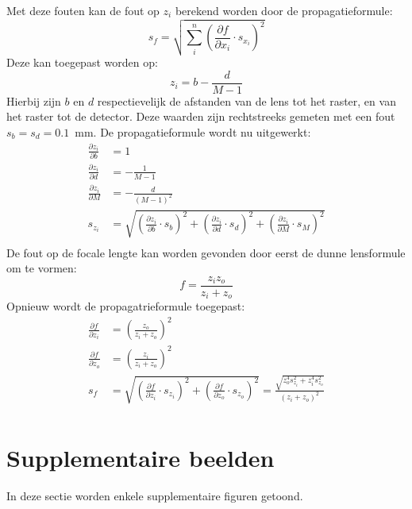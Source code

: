 \documentclass[we,twoside,openright,a4paper,11pt]{uantwerpenbamathesis}
\begin{document}
Met deze fouten kan de fout op $z_i$ berekend worden door de propagatieformule:
\begin{equation*}
    s_f=\sqrt{\sum_i^n \left(\frac{\partial f}{\partial x_i}\cdot s_{x_i}\right)^2}
\end{equation*}
Deze kan toegepast worden op:
\begin{equation*}
    z_i=b-\frac{d}{M-1}
\end{equation*}
Hierbij zijn $b$ en $d$ respectievelijk de afstanden van de lens tot het raster, en van het raster tot de detector. Deze waarden zijn rechtstreeks gemeten met een fout $s_b=s_d=0.1$~mm. De propagatieformule wordt nu uitgewerkt:
\begin{align*}
    \frac{\partial z_i}{\partial b}&=1\\
    \frac{\partial z_i}{\partial d}&=-\frac{1}{M-1}\\
    \frac{\partial z_i}{\partial M}&=-\frac{d}{(M-1)^2}\\
    s_{z_i}&=\sqrt{\left(\frac{\partial z_i}{\partial b}\cdot s_{b}\right)^2+\left(\frac{\partial z_i}{\partial d}\cdot s_{d}\right)^2+\left(\frac{\partial z_i}{\partial M}\cdot s_{M}\right)^2}\\
\end{align*}
De fout op de focale lengte kan worden gevonden door eerst de dunne lensformule om te vormen:
\begin{equation*}
    f = \frac{z_i z_o}{z_i+z_o}
\end{equation*}
Opnieuw wordt de propagatrieformule toegepast:
\begin{align*}
    \frac{\partial f}{\partial z_i}&=\left(\frac{z_o}{z_i+z_o}\right)^2\\
    \frac{\partial f}{\partial z_o}&=\left(\frac{z_i}{z_i+z_o}\right)^2\\
    s_{f}&=\sqrt{\left(\frac{\partial f}{\partial z_i}\cdot s_{z_i}\right)^2+\left(\frac{\partial f}{\partial z_o}\cdot s_{z_o}\right)^2}=\frac{\sqrt{z_o^4s_{z_i}^2 + z_i^4s_{z_o}^2}}{(z_i+z_o)^2}\\
\end{align*}

\chapter{Supplementaire beelden}\label{ch:supp_beelden}
In deze sectie worden enkele supplementaire figuren getoond.\\
\end{document}
